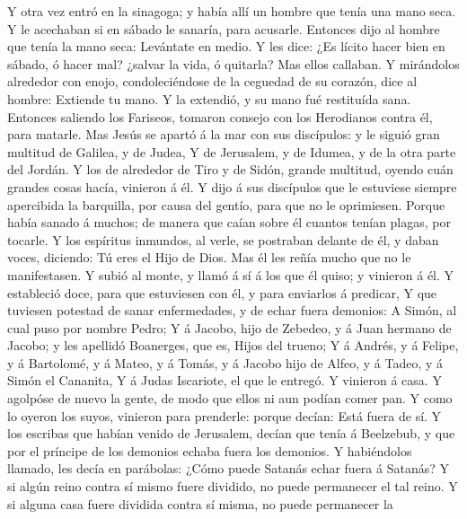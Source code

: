  Y otra vez entró en la sinagoga; y había allí un hombre que
tenía una mano seca.  Y le acechaban si en sábado le
sanaría, para acusarle.  Entonces dijo al hombre que tenía
la mano seca: Levántate en medio.  Y les dice: ¿Es lícito
hacer bien en sábado, ó hacer mal? ¿salvar la vida, ó quitarla? Mas
ellos callaban.  Y mirándolos alrededor con enojo,
condoleciéndose de la ceguedad de su corazón, dice al hombre: Extiende
tu mano. Y la extendió, y su mano fué restituída sana. 
Entonces saliendo los Fariseos, tomaron consejo con los Herodianos
contra él, para matarle.  Mas Jesús se apartó á la mar con
sus discípulos: y le siguió gran multitud de Galilea, y de Judea,
 Y de Jerusalem, y de Idumea, y de la otra parte del Jordán.
Y los de alrededor de Tiro y de Sidón, grande multitud, oyendo cuán
grandes cosas hacía, vinieron á él.  Y dijo á sus discípulos
que le estuviese siempre apercibida la barquilla, por causa del gentío,
para que no le oprimiesen.  Porque había sanado á muchos;
de manera que caían sobre él cuantos tenían plagas, por tocarle.
 Y los espíritus inmundos, al verle, se postraban delante
de él, y daban voces, diciendo: Tú eres el Hijo de Dios. 
Mas él les reñía mucho que no le manifestasen.  Y subió al
monte, y llamó á sí á los que él quiso; y vinieron á él.  Y
estableció doce, para que estuviesen con él, y para enviarlos á
predicar,  Y que tuviesen potestad de sanar enfermedades, y
de echar fuera demonios:  A Simón, al cual puso por nombre
Pedro;  Y á Jacobo, hijo de Zebedeo, y á Juan hermano de
Jacobo; y les apellidó Boanerges, que es, Hijos del trueno;
 Y á Andrés, y á Felipe, y á Bartolomé, y á Mateo, y á
Tomás, y á Jacobo hijo de Alfeo, y á Tadeo, y á Simón el Cananita,
 Y á Judas Iscariote, el que le entregó. Y vinieron á casa.
 Y agolpóse de nuevo la gente, de modo que ellos ni aun
podían comer pan.  Y como lo oyeron los suyos, vinieron
para prenderle: porque decían: Está fuera de sí.  Y los
escribas que habían venido de Jerusalem, decían que tenía á Beelzebub, y
que por el príncipe de los demonios echaba fuera los demonios.
 Y habiéndolos llamado, les decía en parábolas: ¿Cómo puede
Satanás echar fuera á Satanás?  Y si algún reino contra sí
mismo fuere dividido, no puede permanecer el tal reino.  Y
si alguna casa fuere dividida contra sí misma, no puede permanecer la
